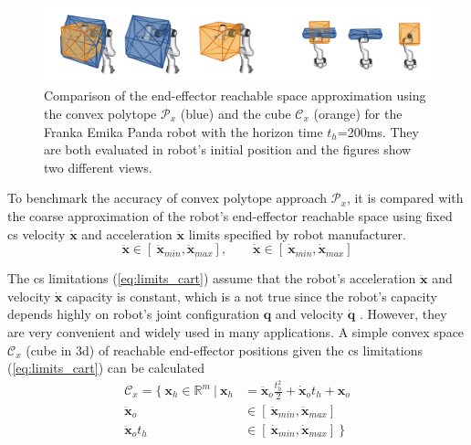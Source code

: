 \begin{figure}[!h]
    \centering
    \includegraphics[width=\linewidth]{Papers/images/comp_200.png}
    \caption{Comparison of the end-effector reachable space approximation using the convex polytope $\mathcal{P}_x$ (blue) and the cube $\mathcal{C}_x$ (orange) for the Franka Emika Panda robot with the horizon time $t_h$=200ms. They are both evaluated in robot's initial position and the figures show two different views.}
    \label{fig:cube}
\end{figure}
To benchmark the accuracy of convex polytope approach $\mathcal{P}_x$, it is compared with the coarse approximation of the robot's end-effector reachable space using fixed \gls{cs} velocity $\dot{\bm{x}}$ and acceleration $\ddot{\bm{x}}$ limits specified by robot manufacturer.
\begin{equation}
    \ddot{\bm{x}}\in [~ \ddot{\bm{x}}_{min},  \ddot{\bm{x}}_{max}], \qquad \dot{\bm{x}} \in [~ \dot{\bm{x}}_{min},  \dot{\bm{x}}_{max}]
    \label{eq:limits_cart}
\end{equation}



The \gls{cs} limitations (\ref{eq:limits_cart}) assume that the robot's acceleration $\ddot{\bm{x}}$ and velocity $\dot{\bm{x}}$ capacity is constant, which is a not true since the robot's capacity depends highly on robot's joint configuration $\bm{q}$ and velocity  $\dot{\bm{q}}$ \cite{Bowling2005}. However, they are very convenient and widely used in many applications. A simple convex space $\mathcal{C}_x$ (cube in 3d) of reachable end-effector positions given the \gls{cs} limitations (\ref{eq:limits_cart}) can be calculated
\begin{equation}
\begin{split}
    \mathcal{C}_x = \{ ~\bm{x}_h \in \mathbb{R}^m ~|~ \bm{x}_h &= \ddot{\bm{x}}_o\frac{t_h^2}{2} + \dot{\bm{x}}_ot_h + \bm{x}_o \\
    \ddot{\bm{x}}_o &\in [~ \ddot{\bm{x}}_{min},  \ddot{\bm{x}}_{max}]\\
    \ddot{\bm{x}}_ot_h &\in [~ \dot{\bm{x}}_{min},  \dot{\bm{x}}_{max}] ~\}
\end{split}
\end{equation}

